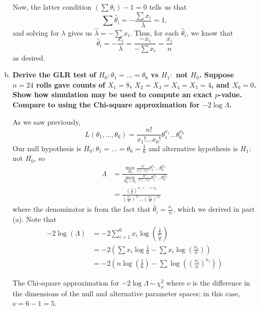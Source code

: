 \begin{enumerate}[a)]
    Now, the latter condition $\left(\sum \theta_i \right) - 1 = 0$ tells us that
    \[
        \sum \hat{\theta}_i = - \frac{\sum x_i}{\lambda} = 1,
    \]
    and solving for $\lambda$ gives us $\hat{\lambda} = - \sum x_i$. Thus, for each $\hat{\theta}_i$, we know that
    \[
        \hat{\theta}_i = -\frac{x_i}{\lambda} = \frac{-x_i}{- \sum x_i} = \frac{x_i}{n}
    \]    
    as desired. 

    \newpage
    
    \item \textbf{Derive the GLR test of $H_0 \colon \theta_1 = \dots = \theta_6$ vs $H_1 \colon$ not $H_0$. Suppose $n=24$ rolls gave counts of $X_1 = 8$, $X_2 = X_3 = X_4 = X_5 = 4$, and $X_6 =0$. Show how simulation may be used to compute an exact $p$-value. Compare to using the Chi-square approximation for $-2\log \Lambda$.} 
    
    As we saw previously, 
    \[
        L(\theta_1, \dots, \theta_6) = \frac{n!}{x_1! \dots x_6!}\theta_1^{x_1} \dots \theta_6^{x_6}
    \]
    Our null hypothesis is $H_0\colon \theta_1 = \dots = \theta_6 = \frac{1}{6}$ and alternative hypothesis is $H_1\colon$ not $H_0$, so
    \begin{align*}
        \Lambda &= \frac{\max\limits_{H_0} \frac{n!}{x_1! \dots x_6!}\theta_1^{x_1} \dots \theta_6^{x_6}}{\max\limits_{H_0 \cup H_1} \frac{n!}{x_1! \dots x_6!}\theta_1^{x_1} \dots \theta_6^{x_6}} \\
        &= \frac{\left( \frac{1}{6} \right)^{x_1 + \dots + x_6} }{\left( \frac{x_1}{n} \right)^{x_1} \dots \left( \frac{x_6}{n} \right)^{x_6} }
    \end{align*}
    where the denominator is from the fact that $\hat{\theta}_i = \frac{x_i}{n}$, which we derived in part (a). Note that
    \begin{align*}
        -2 \log (\Lambda) &= -2 \sum_{i=1}^6 x_i \log \left( \frac{\frac{1}{6}}{\frac{x_i}{n}} \right) \\
        &= -2 \left( \sum x_i \log \frac{1}{6} - \sum x_i \log \left( \frac{x_i}{n} \right) \right) \\
        &= -2 \left( n \log \left(\frac{1}{6}\right) - \sum \log \left( \left( \frac{x_i}{n} \right)^{x_i} \right) \right) 
    \end{align*}

    The Chi-square approximation for $-2 \log \Lambda \, \dot\sim \, \chi^2_{\nu}$ where $\nu$ is the difference in the dimensions of the null and alternative parameter spaces; in this case, $\nu = 6 - 1 = 5$. \\


\end{enumerate}
